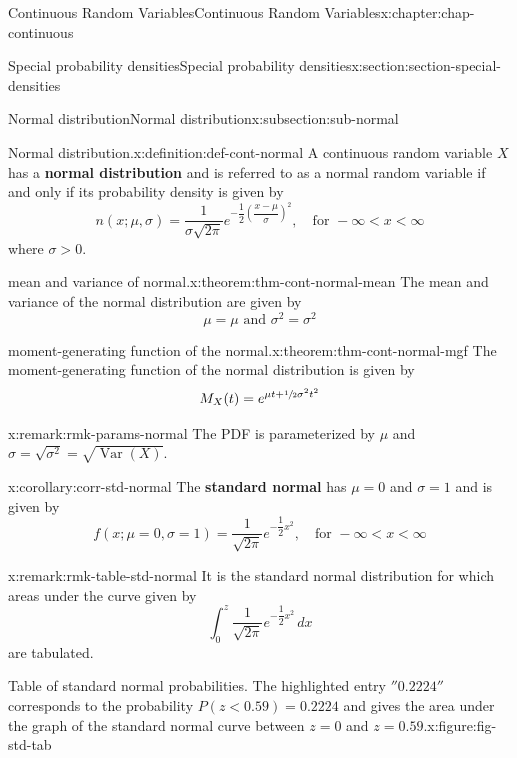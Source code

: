 \documentclass[oneside,10pt,]{book}
\newcommand{\terminology}[1]{\textbf{#1}}
\numberwithin{equation}{section}
\newcommand{\lt}{<}
\newcommand{\gt}{>}
\begin{document}
\begin{chapterptx}{Continuous Random Variables}{}{Continuous Random Variables}{}{}{x:chapter:chap-continuous}
\begin{sectionptx}{Special probability densities}{}{Special probability densities}{}{}{x:section:section-special-densities}
\begin{subsectionptx}{Normal distribution}{}{Normal distribution}{}{}{x:subsection:sub-normal}
\begin{definition}{Normal distribution.}{x:definition:def-cont-normal}
A continuous random variable \(\displaystyle X\) has a \terminology{normal distribution} and is referred to as a normal random variable if and only if its probability density is given by%
\begin{equation*}
n(x; \mu, \sigma) = \dfrac{1}{\sigma\sqrt{2\pi}}
e^{-\dfrac{1}{2}\left(\dfrac{x-\mu}{\sigma}\right)^2}, \quad \text{
for }-\infty \lt x \lt \infty
\end{equation*}
where \(\sigma \gt 0\).%
\end{definition}
\begin{theorem}{mean and variance of normal.}{}{x:theorem:thm-cont-normal-mean}%
The mean and variance of the normal distribution are given by%
\begin{equation*}
\mu = \mu\text{ and }\sigma^2 = \sigma^2
\end{equation*}
%
\end{theorem}
\begin{theorem}{moment-generating function of the normal.}{}{x:theorem:thm-cont-normal-mgf}%
The moment-generating function of the normal distribution is given by%
\begin{equation*}
M_X(t) = e^{\mu t + \sfrac{1}{2}\sigma^2t^2}
\end{equation*}
%
\end{theorem}
\begin{remark}{}{x:remark:rmk-params-normal}%
The PDF is parameterized by \(\mu\) and \(\sigma = \sqrt{\sigma^2} =
\sqrt{\operatorname{Var}(X)}\).%
\end{remark}
\begin{corollary}{}{}{x:corollary:corr-std-normal}%
The \terminology{standard normal} has \(\mu = 0\) and \(\sigma =
1\) and is given by%
\begin{equation*}
f(x; \mu = 0, \sigma = 1) =
\dfrac{1}{\sqrt{2\pi}}
e^{-\dfrac{1}{2}x^2}, \quad \text{
for }-\infty \lt x \lt \infty
\end{equation*}
%
\end{corollary}
\begin{remark}{}{x:remark:rmk-table-std-normal}%
It is the standard normal distribution for which areas under the curve given by%
\begin{equation*}
\int_0^z \dfrac{1}{\sqrt{2\pi}}
e^{-\dfrac{1}{2}x^2}\,dx
\end{equation*}
are tabulated.%
\begin{figureptx}{Table of standard normal probabilities. The highlighted entry \(''0.2224''\) corresponds to the probability \(P(z \lt 0.59) =
0.2224\) and gives the area under the graph of the standard normal curve between \(z=0\) and \(z =0.59\).}{x:figure:fig-std-tab}{}%

\end{figureptx}
\end{remark}
\end{subsectionptx}
\end{sectionptx}
\end{chapterptx}
\end{document}
